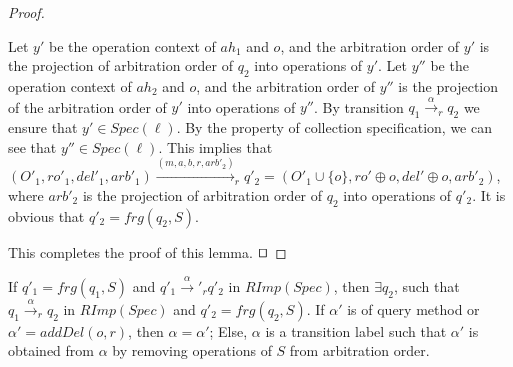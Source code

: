 \begin {proof}
\begin{itemize}
    Let $y'$ be the operation context of $\mathit{ah}_1$ and $o$, and the arbitration order of $y'$ is the projection of arbitration order of $q_2$ into operations of $y'$. Let $y''$ be the operation context of $\mathit{ah}_2$ and $o$, and the arbitration order of $y''$ is the projection of the arbitration order of $y'$ into operations of $y''$. By transition $q_1 {\xrightarrow{\alpha}}_r q_2$ we ensure that $y' \in \mathit{Spec}(\ell)$. By the property of collection specification, we can see that $y'' \in \mathit{Spec}(\ell)$. This implies that $(O'_1,\mathit{ro}'_1,\mathit{del}'_1,\mathit{arb}'_1) {\xrightarrow{(m,a,b,r,\mathit{arb}'_2)}}_r q'_2 =  (O'_1 \cup \{ o \},\mathit{ro}' \oplus o ,\mathit{del}' \oplus o,\mathit{arb}'_2)$, where $\mathit{arb}'_2$ is the projection of arbitration order of $q_2$ into operations of $q'_2$. It is obvious that $q'_2 = \mathit{frg}(q_2,S)$.
\end{itemize} 
This completes the proof of this lemma. $\qed$
\end {proof} 



\begin{lemma}
\label{lemma:SRImpSpec is simulated by RimpSpec}
If $q'_1 = \mathit{frg}(q_1,S)$ and $q'_1 {\xrightarrow{\alpha}'}_r q'_2$ in $\mathit{RImp}(\mathit{Spec})$, then $\exists q_2$, such that $q_1 {\xrightarrow{\alpha}}_r q_2$ in $\mathit{RImp}(\mathit{Spec})$ and $q'_2 = \mathit{frg}(q_2,S)$. If $\alpha'$ is of query method or $\alpha' = \mathit{addDel}(o,r)$, then $\alpha = \alpha'$; Else, $\alpha$ is a transition label such that $\alpha'$ is obtained from $\alpha$ by removing operations of $S$ from arbitration order. 
\end{lemma}

